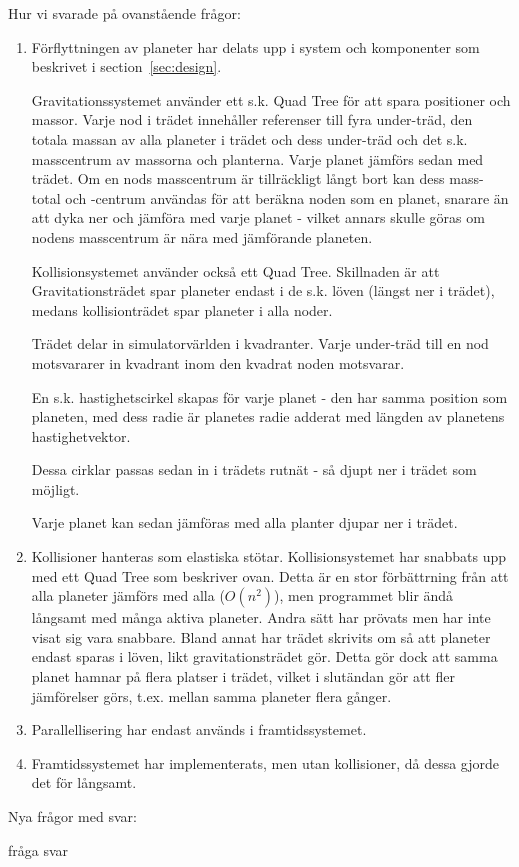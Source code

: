 
Hur vi svarade på ovanstående frågor:
\begin{enumerate}
    \item Förflyttningen av planeter har delats upp i system och komponenter
        som beskrivet i section~\ref{sec:design}.

        \vspace{6pt}

        Gravitationssystemet använder ett s.k. Quad Tree för att
        spara positioner och massor.
        Varje nod i trädet innehåller referenser till fyra under-träd, 
        den totala massan av alla planeter i trädet och dess under-träd
        och det s.k. masscentrum av massorna och planterna.
        Varje planet jämförs sedan med trädet.
        Om en nods masscentrum är tillräckligt långt bort kan
        dess mass-total och -centrum
        användas för att beräkna noden som en planet, snarare än att
        dyka ner och jämföra med varje planet - vilket annars skulle göras
        om nodens masscentrum är nära med jämförande planeten.

        \vspace{6pt}

        Kollisionsystemet använder också ett Quad Tree.
        Skillnaden är att Gravitationsträdet spar planeter endast i
        de s.k. löven (längst ner i trädet), medans kollisionträdet
        spar planeter i alla noder.

        Trädet delar in simulatorvärlden i kvadranter.
        Varje under-träd till en nod motsvararer in kvadrant inom
        den kvadrat noden motsvarar.

        En s.k. hastighetscirkel skapas för varje planet - 
        den har samma position som planeten, med dess radie
        är planetes radie adderat med längden av planetens hastighetvektor.

        Dessa cirklar passas sedan in i trädets rutnät - så djupt ner i
        trädet som möjligt.

        Varje planet kan sedan jämföras med alla planter djupar ner i trädet.

    \item Kollisioner hanteras som elastiska stötar.
        Kollisionsystemet har snabbats upp med ett Quad Tree som beskriver
        ovan. Detta är en stor förbättrning från att alla planeter
        jämförs med alla ($O(n^2)$), men programmet blir ändå långsamt med
        många aktiva planeter.
        Andra sätt har prövats men har inte visat sig vara snabbare.
        Bland annat har trädet skrivits om så att planeter endast sparas
        i löven, likt gravitationsträdet gör. Detta gör
        dock att samma planet hamnar på flera platser i trädet, vilket
        i slutändan gör att fler jämförelser görs, t.ex. mellan samma
        planeter flera gånger.
    \item Parallellisering har endast används i framtidssystemet.
    \item Framtidssystemet har implementerats, men utan kollisioner,
        då dessa gjorde det för långsamt.
\end{enumerate}

Nya frågor med svar:

\begin{Description}
    \item[fråga] svar %
\end{Description}
